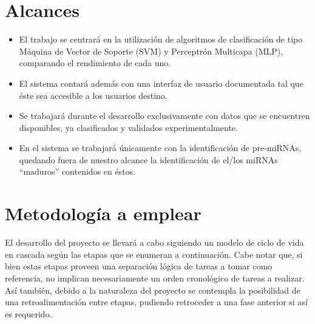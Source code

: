 \documentclass[12pt,bibliography=openstyle,DIV=12,parskip=full-]{scrartcl}
\begin{document}
\section{Alcances}
\begin{itemize}
\item El trabajo se centrará en la utilización de algoritmos de
  clasificación de tipo Máquina de Vector de Soporte (SVM) y Perceptrón
  Multicapa (MLP), comparando el rendimiento de cada uno.
\item El sistema contará además con una interfaz de usuario
  documentada tal que éste sea accesible a los usuarios destino.
\item Se trabajará durante el desarrollo exclusivamente con datos que
  se encuentren disponibles, ya clasificados y validados
  experimentalmente.
\item En el sistema se trabajará únicamente con la identificación de
  pre-miRNAs, quedando fuera de nuestro alcance la identificación de
  el/los miRNAs “maduros” contenidos en éstos.
\end{itemize}
%
%
\section{Metodología a emplear}
El desarrollo del proyecto se llevará a cabo siguiendo un modelo de
ciclo de vida en cascada según las etapas que se enumeran a
continuación.  Cabe notar que, si bien estas etapas proveen una
separación lógica de tareas a tomar como referencia, no implican
necesariamente un orden cronológico de tareas a realizar. Así también,
debido a la naturaleza del proyecto se contempla la posibilidad de una
retroalimentación entre etapas, pudiendo retroceder a una fase
anterior si así es requerido.
%
\end{document}
